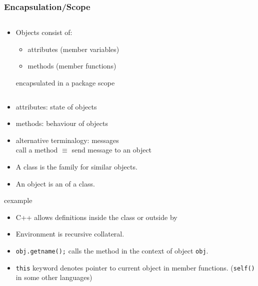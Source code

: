 \begin{frame}
\frametitle{Encapsulation/Scope}
\begin{columns}
\begin{column}{8cm}
\begin{itemize}
\item Objects consist of:
\begin{itemize}
\item attributes (member variables)
\item methods (member functions)
\end{itemize}
encapsulated in a package scope
\end{itemize}
\end{column}
\begin{column}{4cm}
\scriptsize
{}
\end{column}
\end{columns}
\begin{itemize}
\item attributes: state of objects
\item methods: behaviour of objects
\item alternative terminalogy: messages\\
	call a method $\equiv$ send message to an object
\item A class is the family for similar objects. 
\item An object is an  of a class.
\end{itemize}
\end{frame}

\begin{frame}
\begin{beamercolorbox}{cexample}
\codePerson
\end{beamercolorbox}
\begin{itemize}
\item C++ allows definitions inside the class or outside by 
\item Environment is recursive collateral.
\item \lstinline!obj.getname();! calls the method in the context of object \texttt{obj}.
\item \lstinline!this! keyword denotes pointer to current object in member functions.
	(\lstinline!self()! in some other languages)
\end{itemize}
\end{frame}

